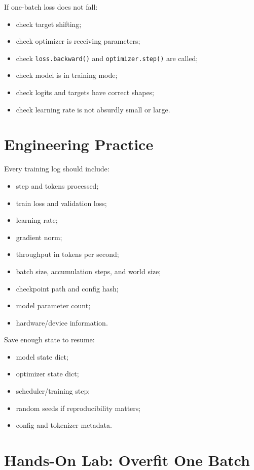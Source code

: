 If one-batch loss does not fall:

\begin{itemize}
  \item check target shifting;
  \item check optimizer is receiving parameters;
  \item check \texttt{loss.backward()} and \texttt{optimizer.step()} are called;
  \item check model is in training mode;
  \item check logits and targets have correct shapes;
  \item check learning rate is not absurdly small or large.
\end{itemize}

\section{Engineering Practice}

Every training log should include:

\begin{itemize}
  \item step and tokens processed;
  \item train loss and validation loss;
  \item learning rate;
  \item gradient norm;
  \item throughput in tokens per second;
  \item batch size, accumulation steps, and world size;
  \item checkpoint path and config hash;
  \item model parameter count;
  \item hardware/device information.
\end{itemize}

Save enough state to resume:

\begin{itemize}
  \item model state dict;
  \item optimizer state dict;
  \item scheduler/training step;
  \item random seeds if reproducibility matters;
  \item config and tokenizer metadata.
\end{itemize}

\section{Hands-On Lab: Overfit One Batch}

